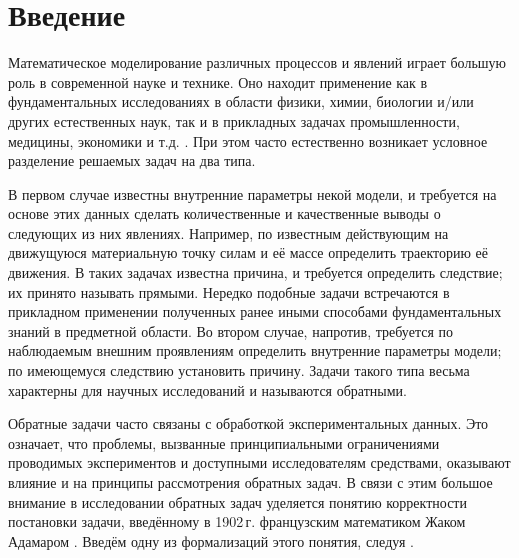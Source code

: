 \newpage
\section{Введение}

Математическое моделирование различных процессов и явлений играет большую роль в современной науке и технике. Оно находит применение как в фундаментальных исследованиях в области физики, химии, биологии и/или других естественных наук, так и в прикладных задачах промышленности, медицины, экономики и т.д. \cite{samarskiy_models}. При этом часто естественно возникает условное разделение решаемых задач на два типа.

В первом случае известны внутренние параметры некой модели, и требуется на основе этих данных сделать количественные и качественные выводы о следующих из них явлениях. Например, по известным действующим на движущуюся материальную точку силам и её массе определить траекторию её движения. В таких задачах известна причина, и требуется определить следствие; их принято называть прямыми. Нередко подобные задачи встречаются в прикладном применении полученных ранее иными способами фундаментальных знаний в предметной области. Во втором случае, напротив, требуется по наблюдаемым внешним проявлениям определить внутренние параметры модели; по имеющемуся следствию установить причину. Задачи такого типа весьма характерны для научных исследований и называются обратными.

Обратные задачи часто связаны с обработкой экспериментальных данных. Это означает, что проблемы, вызванные принципиальными ограничениями проводимых экспериментов и доступными исследователям средствами, оказывают влияние и на принципы рассмотрения обратных задач. В связи с этим большое внимание в исследовании обратных задач уделяется понятию корректности постановки задачи, введённому в 1902\,г. французским математиком Жаком Адамаром \cite{hadamard}. Введём одну из формализаций этого понятия, следуя \cite{den}.

